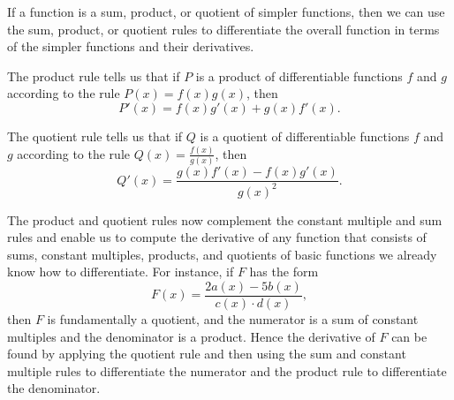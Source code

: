\begin{summary}
\item If a function is a sum, product, or quotient of simpler functions, then we can use the sum, product, or quotient rules to differentiate the overall function in terms of the simpler functions and their derivatives.  
\item The product rule tells us that if $P$ is a product of differentiable functions $f$ and $g$ according to the rule $P(x) = f(x) g(x)$, then 
$$P'(x) = f(x)g'(x) + g(x)f'(x).$$
\item The quotient rule tells us that if $Q$ is a quotient of differentiable functions $f$ and $g$ according to the rule $Q(x) = \frac{f(x)}{g(x)}$, then 
$$Q'(x) = \frac{g(x)f'(x) - f(x)g'(x)}{g(x)^2}.$$
\item The product and quotient rules now complement the constant multiple and sum rules and enable us to compute the derivative of any function that consists of sums, constant multiples, products, and quotients of basic functions we already know how to differentiate.  For instance, if $F$ has the form
$$F(x) = \frac{2a(x) - 5b(x)}{c(x) \cdot d(x)},$$
then $F$ is fundamentally a quotient, and the numerator is a sum of constant multiples and the denominator is a product.  Hence the derivative of $F$ can be found by applying the quotient rule and then using the sum and constant multiple rules to differentiate the numerator and the product rule to differentiate the denominator.
\end{summary}

\nin \hrulefill

 

\clearpage
